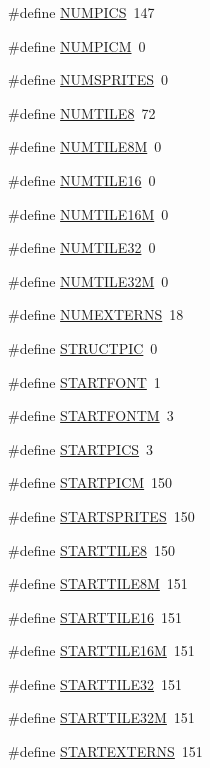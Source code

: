 \begin{DoxyCompactItemize}
\#define \hyperlink{GFXV__SOD_8H_a437727f0f1480aff6a1437f8881e2241}{NUMPICS}~147
\item 
\#define \hyperlink{GFXV__SOD_8H_a2eb878497ab6b2a4f80015a218f38c8f}{NUMPICM}~0
\item 
\#define \hyperlink{GFXV__SOD_8H_ac7e5f97c96cc0101c6f998c7010813a3}{NUMSPRITES}~0
\item 
\#define \hyperlink{GFXV__SOD_8H_a1ad83311a1b6300dcac06636eb1d03b4}{NUMTILE8}~72
\item 
\#define \hyperlink{GFXV__SOD_8H_a99d75e9d203bae79464f2ecd3fd31b8d}{NUMTILE8M}~0
\item 
\#define \hyperlink{GFXV__SOD_8H_a64d23288f15517babe845b31bebdf108}{NUMTILE16}~0
\item 
\#define \hyperlink{GFXV__SOD_8H_a80bd5aa78c52471ba88d9d15baeb5e44}{NUMTILE16M}~0
\item 
\#define \hyperlink{GFXV__SOD_8H_a63d2fe64d989433ecd39d601070bfe04}{NUMTILE32}~0
\item 
\#define \hyperlink{GFXV__SOD_8H_ac85fdf79a513ee60e10cbb347ba5129f}{NUMTILE32M}~0
\item 
\#define \hyperlink{GFXV__SOD_8H_abb86554baf24d8863e54bf20d68120b5}{NUMEXTERNS}~18
\item 
\#define \hyperlink{GFXV__SOD_8H_aa325a0ff072fddd0404951d4f486fcaa}{STRUCTPIC}~0
\item 
\#define \hyperlink{GFXV__SOD_8H_a91e546d8307de206a3822f7ea9064cb2}{STARTFONT}~1
\item 
\#define \hyperlink{GFXV__SOD_8H_a8e97342cc14d7aed1d20b6ff859f22ef}{STARTFONTM}~3
\item 
\#define \hyperlink{GFXV__SOD_8H_aaf17bc60cff0a0236cafed9026641531}{STARTPICS}~3
\item 
\#define \hyperlink{GFXV__SOD_8H_abd418cd2e72de01524b8400b58ad8273}{STARTPICM}~150
\item 
\#define \hyperlink{GFXV__SOD_8H_a08f15ca2b66024c7df43a601df18e33a}{STARTSPRITES}~150
\item 
\#define \hyperlink{GFXV__SOD_8H_a63a36c8955b74ee16ba0fc61f4d62478}{STARTTILE8}~150
\item 
\#define \hyperlink{GFXV__SOD_8H_a56df7bfae7e081f1fe22c67f356c0f12}{STARTTILE8M}~151
\item 
\#define \hyperlink{GFXV__SOD_8H_adde5c841b7c315dca1c114be851a14bf}{STARTTILE16}~151
\item 
\#define \hyperlink{GFXV__SOD_8H_a8158cbe2ebd8e9f311fd7637be063176}{STARTTILE16M}~151
\item 
\#define \hyperlink{GFXV__SOD_8H_afdb080cedc6a487f761df7481033e345}{STARTTILE32}~151
\item 
\#define \hyperlink{GFXV__SOD_8H_a04e773bd033b5375cb82a2bc5142eb3a}{STARTTILE32M}~151
\item 
\#define \hyperlink{GFXV__SOD_8H_a4bab9c7dbc3408ece8bf42a298f4a0ad}{STARTEXTERNS}~151
\end{DoxyCompactItemize}
